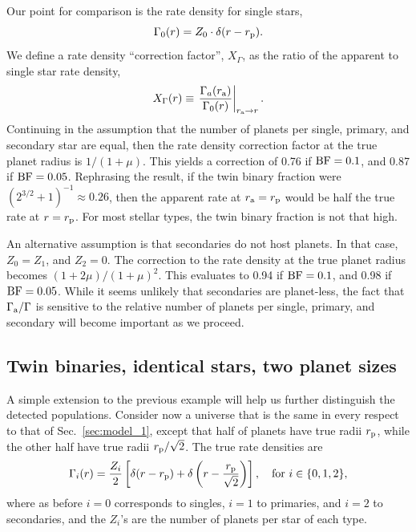 \documentclass[12pt,modern]{aastex61}
\renewcommand{\a}{_{\rm a}}
\newcommand{\p}{_{\rm p}}
\begin{document}
Our point for comparison is the rate density for single stars,
\begin{equation}
\Gamma_0(r) = Z_0 \cdot \delta(r-r\p).
\end{equation}
We define a rate density ``correction factor'', $X_\Gamma$, as the ratio 
of the apparent to single star rate density,
\begin{equation}
X_\Gamma(r) \equiv \left. \frac{\Gamma_a(r\a)}{\Gamma_0(r)} \right|_{r\a 
    \rightarrow r}.
\end{equation}
Continuing in the assumption that the number of planets per single, primary, 
and secondary star are equal, then the rate density 
correction factor at the true planet radius is $1/(1+\mu)$.
This yields a correction of 0.76 if ${\rm BF}=0.1$, and 0.87 if ${\rm 
    BF}=0.05$. Rephrasing the result, if the twin binary fraction were 
$(2^{3/2}+1)^{-1}\approx 0.26$, then the apparent rate at $r\a=r\p$ would be 
half the true rate at $r=r\p$.
For most stellar types, the twin binary fraction is not that high.

An alternative assumption is that secondaries do not host planets. In that 
case, $Z_0=Z_1$, and $Z_2=0$. The correction to the rate density at the true 
planet radius becomes $(1+2\mu)/(1+\mu)^2$.
This evaluates to 0.94 if ${\rm BF}=0.1$, and 0.98 if ${\rm BF}=0.05$.
While it seems unlikely that secondaries are planet-less, 
the fact that $\Gamma\a/\Gamma$ is sensitive to the relative number 
of planets per single, primary, and secondary will become important as we 
proceed.

\subsection{Twin binaries, identical stars, two planet sizes}

A simple extension to the previous example will help us further distinguish 
the detected populations.
Consider now a universe that is the same in every respect to that of 
Sec.~\ref{sec:model_1}, except that half of planets have true radii $r\p$, 
while the other half have true radii $r\p/\sqrt{2}$.
The true rate densities are
\begin{equation}
\Gamma_i(r) = \frac{Z_i}{2} \left[
\delta(r-r\p) + \delta\left(r-\frac{r\p}{\sqrt{2}}\right)
\right], \quad {\rm for}\  i \in \{ 0,1,2 \},
\end{equation}
where as before $i=0$ corresponds to singles, $i=1$ to primaries, and $i=2$ to 
secondaries, and the $Z_i$'s are the number of planets per star of each type.
\end{document}
